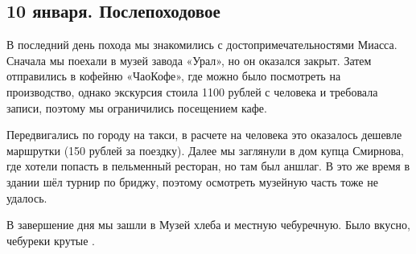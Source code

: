 \subsection{10 января. Послепоходовое}

В последний день похода мы знакомились с достопримечательностями Миасса. Сначала мы поехали в музей завода «Урал», но он оказался закрыт. Затем отправились в кофейню «ЧаоКофе», где можно было посмотреть на производство, однако экскурсия стоила 1100 рублей с человека и требовала записи, поэтому мы ограничились посещением кафе.

Передвигались по городу на такси, в расчете на человека это оказалось дешевле маршрутки (150 рублей за поездку). Далее мы заглянули в дом купца Смирнова, где хотели попасть в пельменный ресторан, но там был аншлаг. В это же время в здании шёл турнир по бриджу, поэтому осмотреть музейную часть тоже не удалось.

В завершение дня мы зашли в Музей хлеба и местную чебуречную. Было вкусно, чебуреки крутые \smiley.

\clearpage